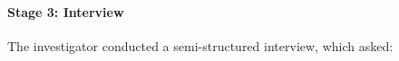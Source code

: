 




\paragraph{Stage 3: Interview}

The investigator conducted a semi-structured interview, which asked: 


